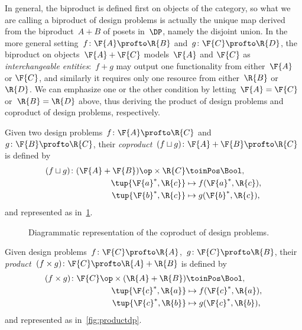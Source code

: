 In general, the biproduct is defined first on objects of the category, so what we are calling a biproduct of design problems is actually the unique map derived from the biproduct~$A + B$ of posets in~$\DP$, namely the disjoint union. In the more general setting~$f\colon \F{A} \profto \R{B}$ and~$g \colon \F{C} \profto \R{D}$, the biproduct on objects~$\F{A} + \F{C}$ models~$\F{A}$ and $\F{C}$ as \emph{interchangeable entities}:~$f+g$ may output one functionality from either~$\F{A}$ or $\F{C}$, and similarly it requires only one resource from either~$\R{B}$ or~$\R{D}$. We can emphasize one or the other condition by letting~$\F{A} = \F{C}$ or~$\R{B} =\R{D}$ above, thus deriving the product of design problems and coproduct of design problems, respectively.


\begin{definition}
  \label{define:coproduct}
  Given two design problems~$f\colon \F{A} \profto \R{C}$ and~$g \colon \F{B} \profto \R{C}$, their \emph{coproduct}~$(f \sqcup g)\colon \F{A} + \F{B} \profto \R{C}$ is defined by
  \begin{equation}
    \begin{aligned}
      (f \sqcup g) \colon (\F{A} + \F{B})\op \times \R{C} & \toinPos \Bool,  \\
      \tup{ \F{a}^*, \R{c}} & \mapsto f(\F{a}^*, \R{c}), \\
      \tup{ \F{b}^*, \R{c}} & \mapsto g(\F{b}^*, \R{c}),
    \end{aligned}
  \end{equation}
  and represented as in~\cref{fig:coproductdp}.
\end{definition}

\begin{figure}[h!]
  \begin{center}
  \end{center}
  \caption{Diagrammatic representation of the coproduct of design problems. \label{fig:coproductdp}}
\end{figure}

\begin{definition}
  \label{define:product}
  Given design problems~$f\colon \F{C} \profto \R{A}$,~$g \colon \F{C} \profto \R{B}$, their \emph{product}~$(f \times g)\colon \F{C} \profto \R{A} + \R{B}$ is defined by
  \begin{equation}
    \begin{aligned}
      (f \times g) \colon \F{C}\op  \times (\R{A} + \R{B}) & \toinPos \Bool,  \\
      \tup{\F{c}^*, \R{a}} & \mapsto f(\F{c}^*, \R{a}), \\
      \tup{\F{c}^*, \R{b}} & \mapsto g(\F{c}^*, \R{b}),
    \end{aligned}
  \end{equation}
  and represented as in~\cref{fig:productdp}.
\end{definition}

